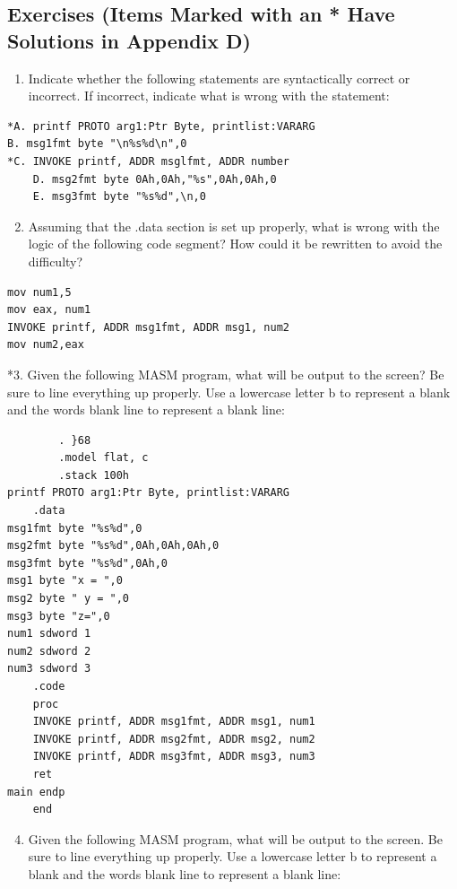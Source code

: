 \documentclass[10pt]{book}
\begin{document}
\subsection{Exercises (Items Marked with an * Have Solutions in Appendix D)}
\begin{enumerate}
  \item Indicate whether the following statements are syntactically correct or incorrect. If incorrect, indicate what is wrong with the statement:
\end{enumerate}

\begin{verbatim}
*A. printf PROTO arg1:Ptr Byte, printlist:VARARG
B. msg1fmt byte "\n%s%d\n",0
*C. INVOKE printf, ADDR msglfmt, ADDR number
    D. msg2fmt byte 0Ah,0Ah,"%s",0Ah,0Ah,0
    E. msg3fmt byte "%s%d",\n,0
\end{verbatim}

\begin{enumerate}
  \setcounter{enumi}{1}
  \item Assuming that the .data section is set up properly, what is wrong with the logic of the following code segment? How could it be rewritten to avoid the difficulty?
\end{enumerate}

\begin{verbatim}
mov num1,5
mov eax, num1
INVOKE printf, ADDR msg1fmt, ADDR msg1, num2
mov num2,eax
\end{verbatim}

*3. Given the following MASM program, what will be output to the screen? Be sure to line everything up properly. Use a lowercase letter b to represent a blank and the words blank line to represent a blank line:

\begin{verbatim}
        . }68
        .model flat, c
        .stack 100h
printf PROTO arg1:Ptr Byte, printlist:VARARG
    .data
msg1fmt byte "%s%d",0
msg2fmt byte "%s%d",0Ah,0Ah,0Ah,0
msg3fmt byte "%s%d",0Ah,0
msg1 byte "x = ",0
msg2 byte " y = ",0
msg3 byte "z=",0
num1 sdword 1
num2 sdword 2
num3 sdword 3
    .code
    proc
    INVOKE printf, ADDR msg1fmt, ADDR msg1, num1
    INVOKE printf, ADDR msg2fmt, ADDR msg2, num2
    INVOKE printf, ADDR msg3fmt, ADDR msg3, num3
    ret
main endp
    end
\end{verbatim}

\begin{enumerate}
  \setcounter{enumi}{3}
  \item Given the following MASM program, what will be output to the screen. Be sure to line everything up properly. Use a lowercase letter b to represent a blank and the words blank line to represent a blank line:
\end{enumerate}
\end{document}
